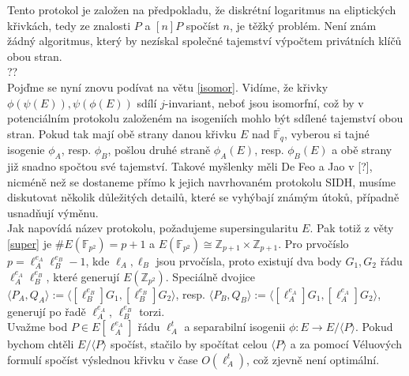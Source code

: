 \documentclass [12pt]{report}
\begin{document}
Tento protokol je založen na předpokladu, že diskrétní logaritmus na eliptických křivkách, tedy ze znalosti $P$ a $[n]P$ spočíst $n$, je těžký problém. Není znám žádný algoritmus, který by nezískal společné tajemství výpočtem privátních klíčů obou stran. \\

??\\

Pojďme se nyní znovu podívat na větu \eqref{isomor}.  Vidíme, že křivky $\phi (\psi (E)), \psi (\phi (E))$ sdílí $j$-invariant, neboť jsou isomorfní, což by v potenciálním protokolu založeném na isogeniích mohlo být sdílené tajemství obou stran. Pokud tak mají obě strany danou křivku $E$ nad $\overline{\mathbb{F}_q}$, vyberou si tajné isogenie $\phi_A$, resp. $\phi_B$, pošlou druhé straně $\phi_A(E)$, resp. $\phi_B(E)$ a obě strany již snadno spočtou své tajemství. Takové myšlenky měli De Feo a Jao v [?], nicméně než se dostaneme přímo k jejich navrhovaném protokolu SIDH, musíme diskutovat několik důležitých detailů, které se vyhýbají známým útoků, případně usnadňují výměnu.\\

Jak napovídá název protokolu, požadujeme supersingularitu $E$. Pak totiž z věty \eqref{super} je $\#E(\mathbb{F}_{p^2}) = p+1$ a $E(\mathbb{F}_{p^2}) \cong \mathbb{Z}_{p+1} \times \mathbb{Z}_{p+1}$. Pro prvočíslo $p = \ell_A ^{e_A} \ell_B ^{e_B} - 1$, kde $\ell_A,\ell_B$ jsou prvočísla, proto existují dva body $G_1,G_2$ řádu $\ell_A ^{e_A} \ell_B ^{e_B}$, které generují $E(\mathbb{Z}_{p^2})$. Speciálně dvojice $\langle P_A, Q_A \rangle := \langle [\ell_B ^{e_B}]G_1, [\ell_B ^{e_B}]G_2 \rangle$, resp. $\langle P_B, Q_B \rangle := \langle  [\ell_A ^{e_A}]G_1, [\ell_A ^{e_A}]G_2 \rangle$, generují po řadě $\ell_A ^{e_A}$, $\ell_B ^{e_B}$ torzi.\\

Uvažme bod $P \in E[\ell_A ^{e_A}]$ řádu $\ell_A  ^t$ a separabilní isogenii $\phi : E \longrightarrow E/\langle P \rangle$. Pokud bychom chtěli $E/\langle P \rangle$ spočíst, stačilo by spočítat celou $\langle P \rangle$ a za pomocí Véluových formulí spočíst výslednou křivku v čase $O(\ell_A  ^t)$, což zjevně není optimální.
\end{document}
